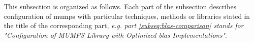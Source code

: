 This subsection is organized as follows. Each part of the subsection describes configuration of \acrshort{mumps} with particular techniques, methods or libraries stated in the title of the corresponding part, \textit{e.g. part \ref{subseq:blas-comparison} stands for "Configuration of MUMPS Library with Optimized \acrshort{blas} Implementations"}.\\